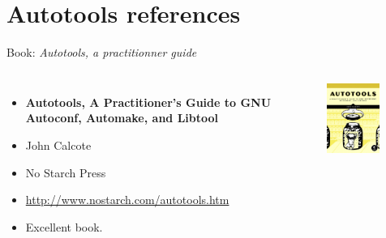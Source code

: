 \section{Autotools references}

\begin{frame}{Book: {\em Autotools, a practitionner guide}}
  \begin{columns}
    \begin{itemize}
    \item {\bf Autotools, A Practitioner's Guide to GNU Autoconf, Automake, and Libtool}
    \item John Calcote
    \item No Starch Press
    \item \url{http://www.nostarch.com/autotools.htm}
    \item Excellent book.
    \end{itemize}
    \includegraphics[width=0.6\textwidth]{slides/autotools-references/autotools-book.png}
  \end{columns}
\end{frame}

